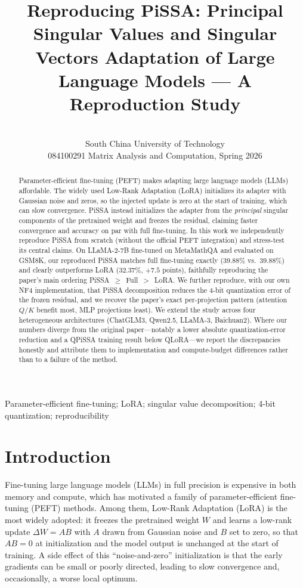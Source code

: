 \documentclass[mlmain]{jmlr}
\title[Reproducing PiSSA]{Reproducing PiSSA: Principal Singular Values and Singular Vectors Adaptation of Large Language Models --- A Reproduction Study}
\author{\Name{Xiangyun Xiao} \Email{ftxiaoxiangyun@mail.scut.edu.cn}\\
\addr South China University of Technology\\
084100291 Matrix Analysis and Computation, Spring 2026}
\begin{document}


\maketitle


\begin{abstract}
Parameter-efficient fine-tuning (PEFT) makes adapting large language models (LLMs) affordable. The widely used Low-Rank Adaptation (LoRA) initializes its adapter with Gaussian noise and zeros, so the injected update is zero at the start of training, which can slow convergence. PiSSA \citep{meng2024pissa} instead initializes the adapter from the \emph{principal} singular components of the pretrained weight and freezes the residual, claiming faster convergence and accuracy on par with full fine-tuning. In this work we independently reproduce PiSSA from scratch (without the official PEFT integration) and stress-test its central claims. On LLaMA-2-7B fine-tuned on MetaMathQA and evaluated on GSM8K, our reproduced PiSSA matches full fine-tuning exactly (39.88\% vs.\ 39.88\%) and clearly outperforms LoRA (32.37\%, $+7.5$ points), faithfully reproducing the paper's main ordering PiSSA~$\ge$~Full~$>$~LoRA. We further reproduce, with our own NF4 implementation, that PiSSA decomposition reduces the 4-bit quantization error of the frozen residual, and we recover the paper's exact per-projection pattern (attention $Q/K$ benefit most, MLP projections least). We extend the study across four heterogeneous architectures (ChatGLM3, Qwen2.5, LLaMA-3, Baichuan2). Where our numbers diverge from the original paper---notably a lower absolute quantization-error reduction and a QPiSSA training result below QLoRA---we report the discrepancies honestly and attribute them to implementation and compute-budget differences rather than to a failure of the method.
\end{abstract}
\begin{keywords}
Parameter-efficient fine-tuning; LoRA; singular value decomposition; 4-bit quantization; reproducibility
\end{keywords}

\section{Introduction}
\label{sec:intro}
Fine-tuning large language models (LLMs) in full precision is expensive in both memory and compute, which has motivated a family of parameter-efficient fine-tuning (PEFT) methods. Among them, Low-Rank Adaptation (LoRA) \citep{hu2022lora} is the most widely adopted: it freezes the pretrained weight $W$ and learns a low-rank update $\Delta W = AB$ with $A$ drawn from Gaussian noise and $B$ set to zero, so that $AB = 0$ at initialization and the model output is unchanged at the start of training. A side effect of this ``noise-and-zero'' initialization is that the early gradients can be small or poorly directed, leading to slow convergence and, occasionally, a worse local optimum.
\end{document}
